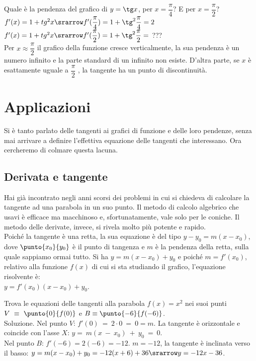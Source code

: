 \begin {esempio}
Quale è la pendenza del grafico di $y=\tg x$, per $x=\dfrac{\pi}{4}$? E per
$x=\dfrac{\pi}{2}$?\\
$f'(x)=1+tg^2 x\srarrow f'(\dfrac{\pi}{4})=1+\tg^2\dfrac{\pi}{4}=2$\\
$f'(x)=1+tg^2 x\srarrow f'(\dfrac{\pi}{2})=1+\tg^2\dfrac{\pi}{2}=$ ???\\
Per $x\approx\dfrac{\pi}{2}$ il grafico della funzione cresce verticalmente,
la sua pendenza è un numero infinito e la parte standard di un infinito non
esiste. D'altra parte, se $x$ è esattamente uguale a $\dfrac{\pi}{2}$ ,
la tangente ha un punto di discontinuità.
\end {esempio}


\section{Applicazioni}
\label{sec:diff01_applicazioni}
Si è tanto parlato delle tangenti ai grafici di funzione e delle loro 
pendenze,
senza mai arrivare a definire l'effettiva equazione delle tangenti che
interessano. Ora cercheremo di colmare questa lacuna.

\subsection{Derivata e tangente}
 Hai già incontrato negli anni scorsi dei problemi in cui si chiedeva di 
 calcolare la tangente ad una parabola in un suo punto. Il metodo di 
calcolo 
 algebrico che usavi è efficace ma macchinoso e, sfortunatamente, vale solo 
 per le coniche. Il metodo delle derivate, invece, si rivela
 molto più potente e rapido.\\
 Poiché la tangente è una retta, la sua equazione è del tipo 
$y-y_0=m(x-x_0)$, 
 dove  $\punto{x_0}{y_0}$ è il punto di tangenza 
 e $m$ è la pendenza della retta, sulla quale sappiamo ormai tutto.
 Si ha $y=m(x-x_0)+y_0$ e poiché $m=f'(x_0)$, relativo alla funzione $f(x)$
 di cui si sta studiando il grafico, l'equazione risolvente è:\\
 $y=f'(x_0)(x-x_0)+y_0$.
 
\begin{esempio}
  Trova le equazioni delle tangenti alla parabola $f(x)=x^2$ nei suoi punti
  $V~\equiv~\punto{0}{f(0)}$ e $B\equiv\punto{-6}{f(-6)}$.\\
  Soluzione. Nel punto $V$: $f'(0)~=~2\cdot 0~=~0=m$. La tangente è 
  orizzontale e coincide con l'asse $X$: $y=~m(x~-~x_0)~+~y_0~=~0$.\\
  Nel punto $B$: $f'(-6)=2 (-6)=-12$. $m=-12$, la tangente è inclinata
  verso il basso:
  $y=m(x-x_0)+y_0= -12(x+6)+36\srarrow y=-12x-36$.
 \end{esempio}

